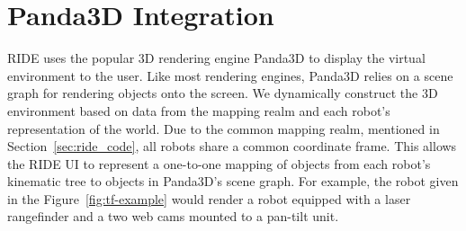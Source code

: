 % 
% 
% 
% 


\section{Panda3D Integration}

RIDE uses the popular 3D rendering engine Panda3D to display the virtual environment to the user. Like most rendering engines, Panda3D relies on a scene graph for rendering objects onto the screen. We dynamically construct the 3D environment based on data from the mapping realm and each robot's representation of the world. Due to the common mapping realm, mentioned in Section~\ref{sec:ride_code}, all robots share a common coordinate frame. This allows the RIDE UI to represent a one-to-one mapping of objects from each robot's kinematic tree to objects in Panda3D's scene graph. For example, the robot given in the Figure~\ref{fig:tf-example} would render a robot equipped with a laser rangefinder and a two web cams mounted to a pan-tilt unit.

